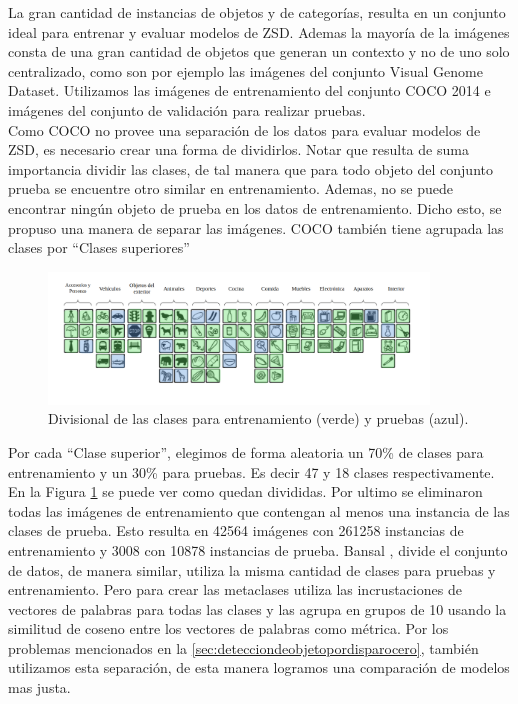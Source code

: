  La gran cantidad de instancias de objetos y de categorías, resulta en un conjunto ideal para entrenar y evaluar modelos de ZSD. Ademas la mayoría de la imágenes consta de una gran cantidad de objetos que generan un contexto y no de uno solo centralizado, como son por ejemplo las imágenes del conjunto Visual Genome Dataset. Utilizamos las imágenes de entrenamiento del conjunto COCO 2014 e imágenes del conjunto de validación para realizar pruebas.
\\
Como COCO no provee una separación de los datos para evaluar modelos de ZSD, es necesario crear una forma de dividirlos. Notar que resulta de suma importancia dividir las clases, de tal manera que para todo objeto del conjunto prueba se encuentre otro similar en entrenamiento. Ademas, no se puede encontrar ningún objeto de prueba en los datos de entrenamiento. Dicho esto, se propuso una manera de separar las imágenes. COCO también tiene agrupada las clases por ``Clases superiores''
\begin{figure}[H]
	\begin{center}
	\centering
	\includegraphics[width=0.9\textwidth]{img/data_set.png}
	\caption{Divisional de las clases para entrenamiento (verde) y pruebas (azul).}
	\label{fig:data_set}
	\end{center}	
\end{figure}
Por cada ``Clase superior'', elegimos de forma aleatoria un 70\% de clases para entrenamiento y un 30\% para pruebas. Es decir 47 y 18 clases respectivamente. En la Figura \ref{fig:data_set} se puede ver como quedan divididas. Por ultimo se eliminaron todas las imágenes de entrenamiento que contengan al menos una instancia de las clases de prueba. Esto resulta en 42564 imágenes con 261258 instancias de entrenamiento y 3008 con 10878 instancias de prueba. Bansal \cite{bansal2018zero}, divide el conjunto de datos, de manera similar, utiliza la misma cantidad de clases para pruebas y entrenamiento. Pero para crear las metaclases utiliza las incrustaciones de vectores de palabras para todas las clases y las agrupa en grupos de 10 usando la similitud de coseno entre los vectores de palabras como métrica. Por los problemas mencionados en la \autoref{sec:detecciondeobjetopordisparocero}, también utilizamos esta separación, de esta manera logramos una comparación de modelos mas justa.

